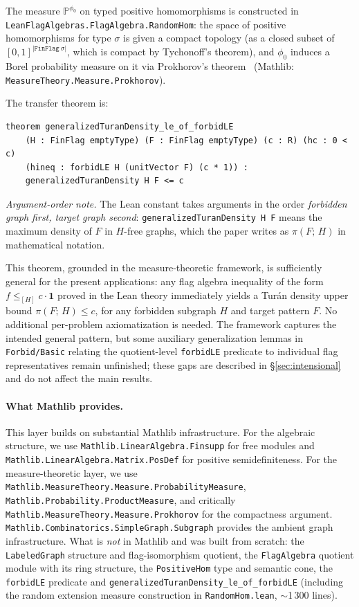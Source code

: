 \documentclass{article}
\newcommand{\tdensity}[2]{\pi(#1;\,#2)}
\newcommand{\lean}[1]{\texttt{#1}}
\begin{document}
The measure $\mathbb{P}^{\phi_0}$ on typed positive homomorphisms is
constructed in \lean{LeanFlagAlgebras.FlagAlgebra.RandomHom}: the space of
positive homomorphisms for type $\sigma$ is given a compact topology (as a
closed subset of $[0,1]^{|\lean{FinFlag}\ \sigma|}$, which is compact by
Tychonoff's theorem), and $\phi_0$ induces a Borel probability measure on it
via Prokhorov's theorem~\cite{billingsley1999convergence}
(Mathlib: \lean{MeasureTheory.Measure.Prokhorov}).

The transfer theorem is:
\begin{lstlisting}
theorem generalizedTuranDensity_le_of_forbidLE
    (H : FinFlag emptyType) (F : FinFlag emptyType) (c : R) (hc : 0 < c)
    (hineq : forbidLE H (unitVector F) (c * 1)) :
    generalizedTuranDensity H F <= c
\end{lstlisting}
\emph{Argument-order note.}  The Lean constant takes arguments in the order
\emph{forbidden graph first, target graph second}: \lean{generalizedTuranDensity H F}
means the maximum density of $F$ in $H$-free graphs, which the paper
writes as $\tdensity{F}{H}$ in mathematical notation.

This theorem, grounded in the measure-theoretic framework, is sufficiently
general for the present applications: any flag algebra inequality of the
form $f \leq_{[H]} c \cdot \mathbf{1}$ proved in the Lean theory immediately
yields a Turán density upper bound $\tdensity{F}{H} \leq c$, for any
forbidden subgraph $H$ and target pattern $F$.  No additional per-problem
axiomatization is needed.  The framework captures the intended general
pattern, but some auxiliary generalization lemmas in \lean{Forbid/Basic}
relating the quotient-level \lean{forbidLE} predicate to individual flag
representatives remain unfinished; these gaps are described in
\S\ref{sec:intensional} and do not affect the main results.

\paragraph{What Mathlib provides.}
This layer builds on substantial Mathlib infrastructure.  For the algebraic
structure, we use \lean{Mathlib.LinearAlgebra.Finsupp} for free modules and
\lean{Mathlib.LinearAlgebra.Matrix.PosDef} for positive semidefiniteness.
For the measure-theoretic layer, we use
\lean{Mathlib.MeasureTheory.Measure.ProbabilityMeasure},
\lean{Mathlib.Probability.ProductMeasure}, and critically
\lean{Mathlib.MeasureTheory.Measure.Prokhorov} for the compactness argument.
\lean{Mathlib.Combinatorics.SimpleGraph.Subgraph} provides the ambient graph
infrastructure.  What is \emph{not} in Mathlib and was built from scratch:
the \lean{LabeledGraph} structure and flag-isomorphism quotient, the
\lean{FlagAlgebra} quotient module with its ring structure, the \lean{PositiveHom}
type and semantic cone, the \lean{forbidLE} predicate and
\lean{generalizedTuranDensity\_le\_of\_forbidLE} (including the random
extension measure construction in \lean{RandomHom.lean}, $\sim$1\,300 lines).
\end{document}
